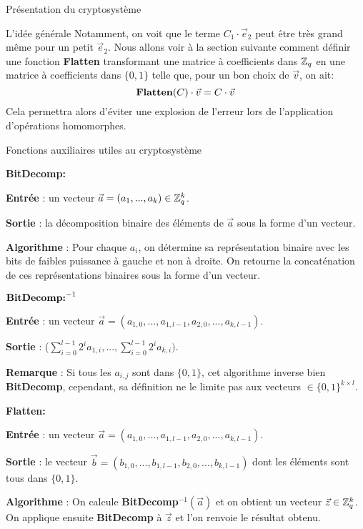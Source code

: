 \begin{section}{Présentation du cryptosystème}
\begin{subsection}{L'idée générale}
	Notamment, on voit que le terme $C_1 \cdot\vec{e}_2$ peut être très grand
	même pour un petit $\vec{e}_2$. Nous allons voir à la section suivante
	comment définir une fonction \textbf{Flatten} transformant une matrice
	à coefficients dans $\mathbb{Z}_q$ en une matrice à coefficients dans $\{0, 1\}$
	telle que, pour un bon choix de $\vec{v}$, on ait:
	\[ \text{\textbf{Flatten}}(C)\cdot\vec{v} = C\cdot\vec{v}\] 
	Cela permettra alors d'éviter une explosion de l'erreur lors de
	l'application d'opérations homomorphes. 
	\end{subsection}
	\begin{subsection}{Fonctions auxiliaires utiles au cryptosystème}

\vspace{0.5cm}\noindent\textbf{BitDecomp:}
\flushleft

	\textbf{Entrée} : un vecteur $\vec{a} = (a_1, ..., a_k) \in \mathbb{Z}_q^{k}$.

	\textbf{Sortie} : la décomposition binaire des éléments de $\vec{a}$ sous la forme d'un vecteur.

	\textbf{Algorithme} : Pour chaque $a_i$, on détermine sa représentation binaire avec les bits de faibles puissance à gauche et non à droite. On retourne la concaténation de ces représentations binaires sous la forme d'un vecteur.
	
\vspace{0.5cm}\noindent$\text{\textbf{BitDecomp:}}^{-1}$
\flushleft

	\textbf{Entrée} : un vecteur $\vec{a} = (a_{1,0}, ..., a_{1,l-1}, a_{2,0}, ..., a_{k,l-1})$.

	\textbf{Sortie} :  ($\sum\limits_{i=0}^{l-1} 2^{i} a_{1,i}, ..., \sum\limits_{i=0}^{l-1} 2^{i} a_{k,i})$.

	\textbf{Remarque} : Si tous les $a_{i,j}$ sont dans $\{ 0,1 \} $, cet algorithme inverse bien \textbf{BitDecomp}, cependant, sa définition ne le limite pas aux vecteurs $\in \{ 0,1\} ^{k\times l}$.

\vspace{0.5cm}\noindent\textbf{Flatten:}
\flushleft

	\textbf{Entrée} : un vecteur $\vec{a} = (a_{1,0}, ..., a_{1,l-1}, a_{2,0}, ..., a_{k,l-1})$.

	\textbf{Sortie} : le vecteur $\vec{b} = (b_{1,0}, ..., b_{1,l-1}, b_{2,0}, ..., b_{k,l-1})$ dont les éléments sont tous dans $\{ 0,1\} $.

	\textbf{Algorithme} : On calcule \textbf{BitDecomp}$^{-1}(\vec{a})$ et on obtient un vecteur $\vec{z} \in \mathbb{Z}_q^{k}$. On applique ensuite \textbf{BitDecomp} à $\vec{z}$ et l'on renvoie le résultat obtenu.
	

\end{subsection}
\end{section}
